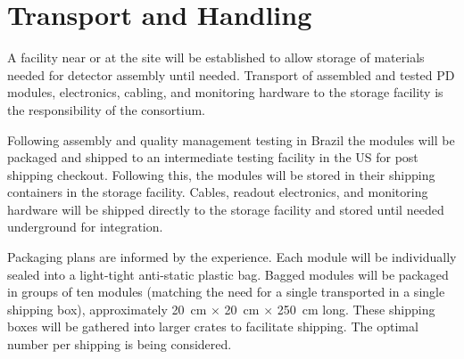 \section{Transport and Handling}
\label{sec:fdsp-pd-install}


%


A facility near or at the  site will be established to allow storage of materials needed for detector assembly until needed.  Transport of assembled and tested PD modules, electronics, cabling, and monitoring hardware to the  storage facility is the responsibility of the  consortium.



Following assembly and quality management testing in Brazil the  modules  will be packaged and shipped to an intermediate testing facility in the US for post shipping checkout. Following this, the modules will be stored in their shipping containers in the storage facility.  Cables, readout electronics, and monitoring hardware will be shipped directly to the storage facility and stored until needed underground for integration.

Packaging plans are informed by the  experience.  Each  module will be individually sealed into a light-tight anti-static plastic bag.  Bagged modules will be packaged in groups of ten modules (matching the need for a single  transported in a single shipping box), approximately \SI{20}{cm} $\times$ \SI{20}{cm} $\times$ \SI{250}{cm} long.  These shipping boxes will be gathered into larger crates to facilitate shipping.  The optimal number per shipping is being considered.

